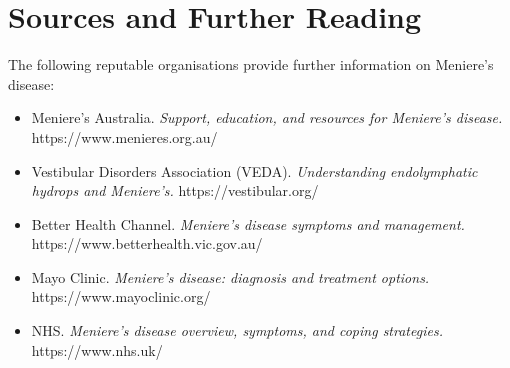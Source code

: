 \section*{Sources and Further Reading}
The following reputable organisations provide further information on Meniere's disease:
\begin{itemize}
    \item Meniere's Australia. \textit{Support, education, and resources for Meniere's disease.} https://www.menieres.org.au/
    \item Vestibular Disorders Association (VEDA). \textit{Understanding endolymphatic hydrops and Meniere's.} https://vestibular.org/
    \item Better Health Channel. \textit{Meniere's disease symptoms and management.} https://www.betterhealth.vic.gov.au/
    \item Mayo Clinic. \textit{Meniere's disease: diagnosis and treatment options.} https://www.mayoclinic.org/
    \item NHS. \textit{Meniere's disease overview, symptoms, and coping strategies.} https://www.nhs.uk/
\end{itemize}

